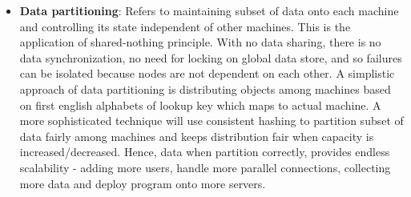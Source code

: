 \begin{itemize}
\begin{figure}[h!]
    \caption{Functional Partitioning in Netflix as an example}
    \label{fig:netflix}
  \end{figure}
Figure \ref{fig:netflix} shows how a netflix streaming service is divided into two major subsystems -
the video processor and the content streamer. This brings a lot of benefits but also increasing
engineering challenges. The main benefits are both service operate independently, parallel teams work
on independent codebases. Each service scales independently of other.
\item \textbf{Data partitioning}:\cite{scalaberules} Refers to maintaining subset of data onto each machine and controlling
  its state independent of other machines. This is the application of shared-nothing principle. With no
  data sharing, there is no data synchronization, no need for locking on global data store, and so
  failures can be isolated because nodes are not dependent on each other. A simplistic approach of data
  partitioning is distributing objects among machines based on first english alphabets of lookup key
  which maps to actual machine. A more sophisticated technique will use consistent hashing to partition
  subset of data fairly among machines and keeps distribution fair when capacity is increased/decreased.
  Hence, data when partition correctly, provides endless scalability - adding more users, handle more
  parallel connections, collecting more data and deploy program onto more servers.
\end{itemize}

\pagebreak


